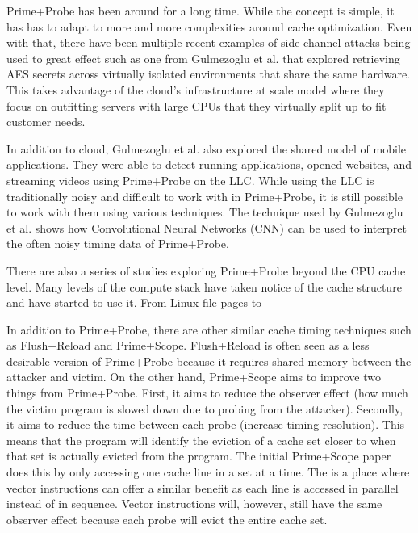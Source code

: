\documentclass[article]{IEEEtran}
\begin{document}
Prime+Probe has been around for a long time. While the concept is simple, it has has to adapt to more and more complexities around cache optimization. Even with that, there have been multiple recent examples of side-channel attacks being used to great effect such as one from Gulmezoglu et al. that explored retrieving AES secrets across virtually isolated environments that share the same hardware\cite{7447807}\cite{10.1007/978-3-662-53140-2_18}. This takes advantage of the cloud's infrastructure at scale model where they focus on outfitting servers with large CPUs that they virtually split up to fit customer needs\cite{7363305}.

In addition to cloud, Gulmezoglu et al. also explored the shared model of mobile applications. They were able to detect running applications, opened websites, and streaming videos using Prime+Probe on the LLC\cite{10.1145/3321705.3329804}. While using the LLC is traditionally noisy and difficult to work with in Prime+Probe, it is still possible to work with them using various techniques\cite{7163050}. The technique used by Gulmezoglu et al. shows how Convolutional Neural Networks (CNN) can be used to interpret the often noisy timing data of Prime+Probe.

There are also a series of studies exploring Prime+Probe beyond the CPU cache level. Many levels of the compute stack have taken notice of the cache structure and have started to use it. From Linux file pages\cite{Kaur2021} to 

In addition to Prime+Probe, there are other similar cache timing techniques such as Flush+Reload\cite{184415}\cite{10.1007/978-3-319-21476-4_8}\cite{7447807} and Prime+Scope\cite{10.1145/3460120.3484816}. Flush+Reload is often seen as a less desirable version of Prime+Probe because it requires shared memory between the attacker and victim. On the other hand, Prime+Scope aims to improve two things from Prime+Probe. First, it aims to reduce the observer effect (how much the victim program is slowed down due to probing from the attacker). Secondly, it aims to reduce the time between each probe (increase timing resolution). This means that the program will identify the eviction of a cache set closer to when that set is actually evicted from the program. The initial Prime+Scope paper does this by only accessing one cache line in a set at a time. The is a place where vector instructions can offer a similar benefit as each line is accessed in parallel instead of in sequence. Vector instructions will, however, still have the same observer effect because each probe will evict the entire cache set.
\end{document}
